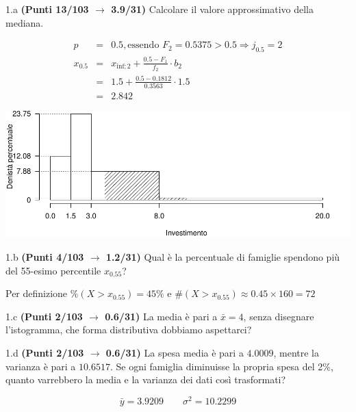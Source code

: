 \documentclass[
  11pt,
]{book}
\theoremstyle{mytheoremstyle}
\theoremstyle{mydefstyle}
\newenvironment{sol}
  {
  \begin{tcolorbox}[enhanced,breakable,arc=0.1mm,boxrule=1pt,colback=white,colframe=iblue,
  title=\bf \fontfamily{lmss}\selectfont \hspace{.5 cm} Soluzione,drop fuzzy shadow]

}{
\end{tcolorbox}
  }
\begin{document}
1.a \textbf{(Punti 13/103 \(\rightarrow\) 3.9/31)} Calcolare il valore approssimativo della mediana.

\begin{sol}

\begin{eqnarray*}
  p &=&  0.5 , \text{essendo }F_{ 2 }= 0.5375  > 0.5  \Rightarrow j_{ 0.5 }= 2 \\
  x_{ 0.5 } &=& x_{\text{inf}; 2 } + \frac{ { 0.5 } - F_{ 1 }} {f_{ 2 }} \cdot b_{ 2 } \\
            &=&  1.5  + \frac {{ 0.5 } -  0.1812 } { 0.3563 } \cdot  1.5  \\
            &=&  2.842 
\end{eqnarray*}

\begin{center}\includegraphics{Esami_passati_con_soluzioni_files/figure-latex/2024-95-1} \end{center}

\end{sol}

1.b \textbf{(Punti 4/103 \(\rightarrow\) 1.2/31)} Qual è la percentuale di famiglie spendono più del 55-esimo percentile \(x_{0.55}\)?

\begin{sol}
Per definizione \(\%(X>x_{0.55})=45\%\) e
\(\#(X>x_{0.55})\approx0.45\times160 =72\)

\end{sol}

1.c \textbf{(Punti 2/103 \(\rightarrow\) 0.6/31)} La media è pari a \(\bar x=4\), senza disegnare l'istogramma, che forma distributiva dobbiamo aspettarci?

1.d \textbf{(Punti 2/103 \(\rightarrow\) 0.6/31)} La spesa media è pari a \(4.0009\), mentre la varianza è pari a \(10.6517\).
Se ogni famiglia diminuisse la propria spesa del 2\%, quanto varrebbero la media e la varianza dei dati così trasformati?

\begin{sol}
\[
\bar y = 3.9209\qquad \sigma^2 = 10.2299
\]

\end{sol}
\end{document}
